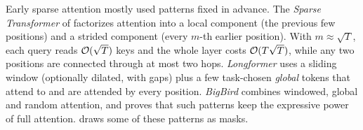 Early sparse attention mostly used patterns fixed in advance. The \emph{Sparse Transformer}
of \citet{child2019sparse} factorizes attention into a local component (the previous few
positions) and a strided component (every $m$-th earlier position). With
$m\approx\sqrt{T}$, each query reads $\mathcal{O}(\sqrt T)$ keys and the whole layer costs
$\mathcal{O}(T\sqrt T)$, while any two positions are connected through at most two hops.
\emph{Longformer} \citep{beltagy2020longformer} uses a sliding window (optionally dilated, with
gaps) plus a few task-chosen \emph{global} tokens that attend to and are attended by every
position. \emph{BigBird} \citep{zaheer2020bigbird} combines windowed, global and random
attention, and proves that such patterns keep the expressive power of full attention.
 draws some of these patterns as masks.

